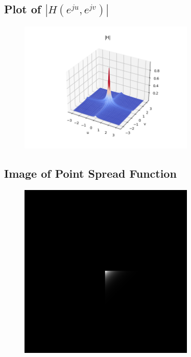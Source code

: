 \documentclass{article}
\begin{document}
\subsection{Plot of $|H(e^{ju}, e^{jv})|$}
\begin{figure}[H]
    \centering
    \includegraphics[width=0.75\textwidth]{../results/section5-python.png}
    \begin{center}
    \end{center}
\end{figure}
\subsection{Image of Point Spread Function}
\begin{figure}[H]
    \centering
    \includegraphics[width=0.75\textwidth]{../results/h_out.png}
    \begin{center}
    \end{center}
\end{figure}
\end{document}
